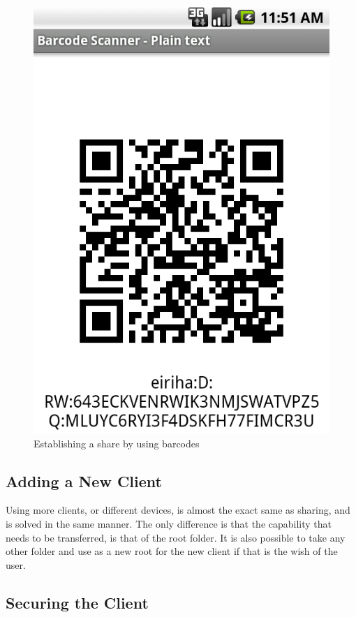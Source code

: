 \documentclass[pdftex,english,10pt,b5paper,twoside]{book}
\begin{document}
\begin{figure}[h!]
    \centering
    \includegraphics[scale=0.4]{client-barcode.png}
    \caption{Establishing a share by using barcodes}
    \label{fig:CSVAndroid:barcode}
\end{figure}

\subsection{Adding a New Client}

Using more clients, or different devices, is almost the exact same as sharing,
and is solved in the same manner. The only difference is that the capability
that needs to be transferred, is that of the root folder. It is also possible
to take any other folder and use as a new root for the new client if that is
the wish of the user.

\subsection{Securing the Client}
\end{document}
